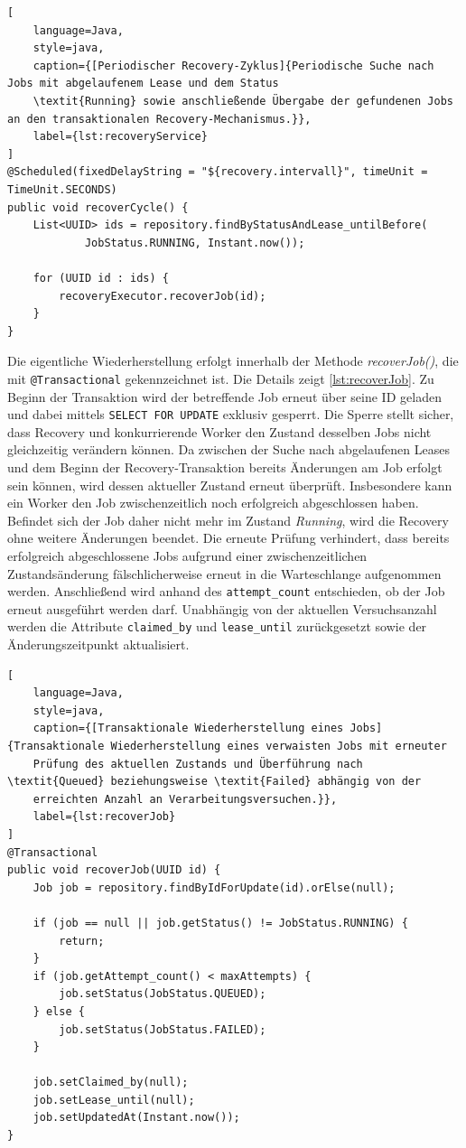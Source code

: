 \begin{lstlisting}[
    language=Java,
    style=java,
    caption={[Periodischer Recovery-Zyklus]{Periodische Suche nach Jobs mit abgelaufenem Lease und dem Status
    \textit{Running} sowie anschließende Übergabe der gefundenen Jobs an den transaktionalen Recovery-Mechanismus.}},
    label={lst:recoveryService}
]
@Scheduled(fixedDelayString = "${recovery.intervall}", timeUnit = TimeUnit.SECONDS)
public void recoverCycle() {
    List<UUID> ids = repository.findByStatusAndLease_untilBefore(
            JobStatus.RUNNING, Instant.now());

    for (UUID id : ids) {
        recoveryExecutor.recoverJob(id);
    }
}
\end{lstlisting}

Die eigentliche Wiederherstellung erfolgt innerhalb der Methode \textit{recoverJob()}, die mit \texttt{@Transactional} gekennzeichnet ist.
Die Details zeigt \cref{lst:recoverJob}.
Zu Beginn der Transaktion wird der betreffende Job erneut über seine ID geladen und dabei mittels \texttt{SELECT FOR UPDATE} exklusiv gesperrt.
Die Sperre stellt sicher, dass Recovery und konkurrierende Worker den Zustand desselben Jobs nicht gleichzeitig verändern können.
Da zwischen der Suche nach abgelaufenen Leases und dem Beginn der Recovery-Transaktion bereits Änderungen am Job erfolgt
sein können, wird dessen aktueller Zustand erneut überprüft.
Insbesondere kann ein Worker den Job zwischenzeitlich noch erfolgreich abgeschlossen haben.
Befindet sich der Job daher nicht mehr im Zustand \textit{Running}, wird die Recovery ohne weitere Änderungen beendet.
Die erneute Prüfung verhindert, dass bereits erfolgreich abgeschlossene Jobs aufgrund einer zwischenzeitlichen Zustandsänderung
fälschlicherweise erneut in die Warteschlange aufgenommen werden.
Anschließend wird anhand des \texttt{attempt\_count} entschieden, ob der Job erneut ausgeführt werden darf.
Unabhängig von der aktuellen Versuchsanzahl werden die Attribute \texttt{claimed\_by} und \texttt{lease\_until} zurückgesetzt sowie
der Änderungszeitpunkt aktualisiert.

\begin{lstlisting}[
    language=Java,
    style=java,
    caption={[Transaktionale Wiederherstellung eines Jobs]{Transaktionale Wiederherstellung eines verwaisten Jobs mit erneuter
    Prüfung des aktuellen Zustands und Überführung nach \textit{Queued} beziehungsweise \textit{Failed} abhängig von der
    erreichten Anzahl an Verarbeitungsversuchen.}},
    label={lst:recoverJob}
]
@Transactional
public void recoverJob(UUID id) {
    Job job = repository.findByIdForUpdate(id).orElse(null);

    if (job == null || job.getStatus() != JobStatus.RUNNING) {
        return;
    }
    if (job.getAttempt_count() < maxAttempts) {
        job.setStatus(JobStatus.QUEUED);
    } else {
        job.setStatus(JobStatus.FAILED);
    }

    job.setClaimed_by(null);
    job.setLease_until(null);
    job.setUpdatedAt(Instant.now());
}
\end{lstlisting}

